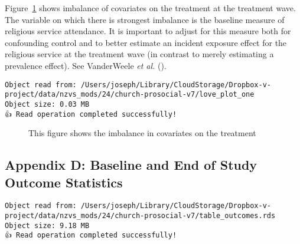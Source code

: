 \documentclass[
  single column]{article}
\begin{document}
Figure~\ref{fig-match_1} shows imbalance of covariates on the treatment
at the treatment wave. The variable on which there is strongest
imbalance is the baseline measure of religious service attendance. It is
important to adjust for this measure both for confounding control and to
better estimate an incident exposure effect for the religious service at
the treatment wave (in contrast to merely estimating a prevalence
effect). See VanderWeele \emph{et al.}
().

\begin{verbatim}
Object read from: /Users/joseph/Library/CloudStorage/Dropbox-v-project/data/nzvs_mods/24/church-prosocial-v7/love_plot_one
Object size: 0.03 MB
👍 Read operation completed successfully!
\end{verbatim}

\begin{figure}


\caption{\label{fig-match_1}This figure shows the imbalance in
covariates on the treatment}

\end{figure}%

\subsection{Appendix D: Baseline and End of Study Outcome
Statistics}\label{appendix-outcomes}

\begin{verbatim}
Object read from: /Users/joseph/Library/CloudStorage/Dropbox-v-project/data/nzvs_mods/24/church-prosocial-v7/table_outcomes.rds
Object size: 9.18 MB
👍 Read operation completed successfully!
\end{verbatim}
\end{document}
